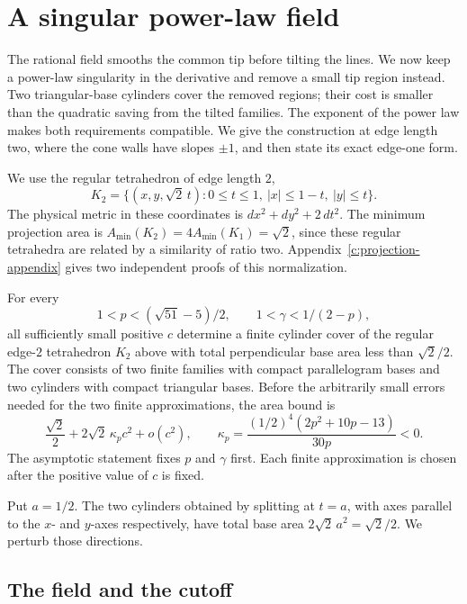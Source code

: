 \section{A singular power-law field}
\label{c:sing-fields}

The rational field smooths the common tip before tilting the lines.  We now
keep a power-law singularity in the derivative and remove a small tip
region instead.  Two triangular-base cylinders cover the removed regions;
their cost is smaller than the quadratic saving from the tilted families.
The exponent of the power law makes both requirements compatible.
We give the construction at edge length two, where the cone walls have
slopes $\pm1$, and then state its exact edge-one form.

We use the regular tetrahedron of edge length $2$,
\[
 K_2=\{(x,y,\sqrt{2}\,t):0\le t\le1,
                 \ |x|\le1-t,\ |y|\le t\}.
\]
The physical metric in these coordinates is $dx^2+dy^2+2\,dt^2$.
The minimum projection area is
$A_{\min}(K_2)=4A_{\min}(K_1)=\sqrt2$, since these regular tetrahedra
are related by a similarity of ratio two.  Appendix~\ref{c:projection-appendix}
gives two independent proofs of this normalization.

\begin{theorem}\label{c:sing-theorem}
For every
\[
 1<p<(\sqrt{51}-5)/2,\qquad 1<\gamma<1/(2-p),
\]
all sufficiently small positive $c$ determine a finite cylinder cover
of the regular edge-$2$ tetrahedron $K_2$ above with total perpendicular
base area less than $\sqrt2/2$.  The cover consists of two finite
families with compact parallelogram bases and two cylinders with
compact triangular bases.  Before the arbitrarily small errors needed
for the two finite approximations, the area bound is
\[
 \frac{\sqrt2}{2}+2\sqrt2\,\kappa_p c^2+o(c^2),
 \qquad
 \kappa_p=\frac{(1/2)^4(2p^2+10p-13)}{30p}<0.
\]
The asymptotic statement fixes $p$ and $\gamma$ first.  Each finite
approximation is chosen after the positive value of $c$ is fixed.
\end{theorem}

Put $a=1/2$.  The two cylinders obtained by splitting at $t=a$,
with axes parallel to the $x$- and $y$-axes respectively, have total
base area $2\sqrt{2}\,a^2=\sqrt{2}/2$.  We perturb those directions.

\subsection{The field and the cutoff}

